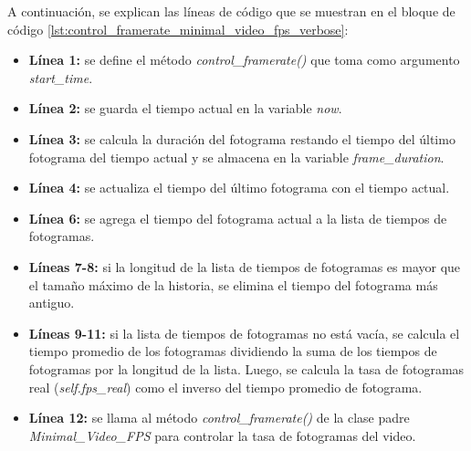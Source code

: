 A continuación, se explican las líneas de código que se muestran en el bloque de código \ref{lst:control_framerate_minimal_video_fps_verbose}:
\begin{itemize}
    \item \textbf{Línea 1:} se define el método \textit{control\_framerate()} que toma como argumento \textit{start\_time}.
    \item \textbf{Línea 2:} se guarda el tiempo actual en la variable \textit{now}.
    \item \textbf{Línea 3:} se calcula la duración del fotograma restando el tiempo del último fotograma del tiempo actual y se almacena en la variable \textit{frame\_duration}.
    \item \textbf{Línea 4:} se actualiza el tiempo del último fotograma con el tiempo actual.
    \item \textbf{Línea 6:} se agrega el tiempo del fotograma actual a la lista de tiempos de fotogramas.
    \item \textbf{Líneas 7-8:} si la longitud de la lista de tiempos de fotogramas es mayor que el tamaño máximo de la historia, se elimina el tiempo del fotograma más antiguo.
    \item \textbf{Líneas 9-11:} si la lista de tiempos de fotogramas no está vacía, se calcula el tiempo promedio de los fotogramas dividiendo la suma de los tiempos de fotogramas por la longitud de la lista. Luego, se calcula la tasa de fotogramas real (\textit{self.fps\_real}) como el inverso del tiempo promedio de fotograma.
    \item \textbf{Línea 12:} se llama al método \textit{control\_framerate()} de la clase padre \textit{Minimal\_Video\_FPS} para controlar la tasa de fotogramas del video.
\end{itemize}
\vspace{\baselineskip}

